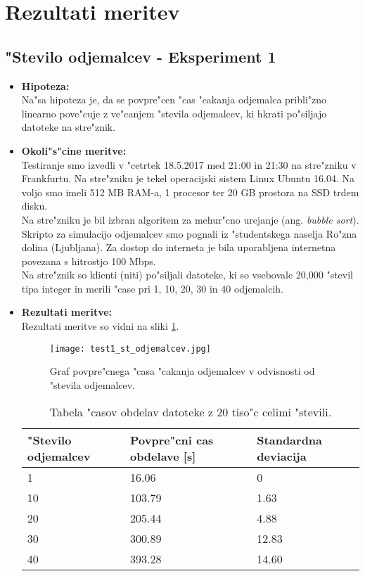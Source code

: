 \newpage
\section{Rezultati meritev}


\subsection{"Stevilo odjemalcev - Eksperiment 1}
\begin{itemize}
	\item \textbf{Hipoteza: }  \\
		Na"sa hipoteza je, da se povpre"cen "cas "cakanja odjemalca pribli"zno linearno pove"cuje z ve"canjem "stevila odjemalcev, ki hkrati po"siljajo datoteke na stre"znik.
			
	\item \textbf{Okoli"s"cine meritve: } \\
		Testiranje smo izvedli v "cetrtek 18.5.2017 med 21:00 in 21:30 na stre"zniku v Frankfurtu. Na stre"zniku je tekel operacijski sistem Linux Ubuntu 16.04. Na voljo smo imeli 512 MB RAM-a, 1 procesor ter 20 GB prostora na SSD trdem disku.\\Na stre"zniku je bil izbran algoritem za mehur"cno urejanje (ang. \textit{bubble sort}). Skripto za simulacijo odjemalcev smo pognali iz "studentskega naselja Ro"zna dolina (Ljubljana). Za dostop do interneta je bila uporabljena internetna povezana s hitrostjo 100 Mbps.\\ Na stre"znik so klienti (niti) po"siljali datoteke, ki so vsebovale 20,000 "stevil tipa integer in merili "case pri 1, 10, 20, 30 in 40 odjemalcih.

 	\item \textbf{Rezultati meritve: }  \\
	Rezultati meritve so vidni na sliki \ref{8_graf_1_rez}.
	\begin{figure}[!htb]
  	\centering
  	  \texttt{[image: test1\_st\_odjemalcev.jpg]}
  	\caption{Graf povpre"cnega "casa "cakanja odjemalcev v odvisnosti od "stevila odjemalcev.}
  	\label{8_graf_1_rez}
	\end{figure}

	\begin{table}[!htbp]
  	\centering
  	\begin{tabular}{ | l | l | l | }
    	\hline
    	"Stevilo odjemalcev & Povpre"cni cas obdelave [s] & Standardna deviacija\\ \hline
    	1 & 16.06     & 0 \\ \hline
    	10 & 103.79 & 1.63\\ \hline
    	20 & 205.44 & 4.88\\ \hline
    	30 & 300.89 & 12.83\\ \hline
    	40 & 393.28 & 14.60\\ \hline
  	\end{tabular}
  	\caption{Tabela "casov obdelav datoteke z 20 tiso"c celimi "stevili.}
  	\label{8_table2}
  	\centering
	\end{table}


\end{itemize}
